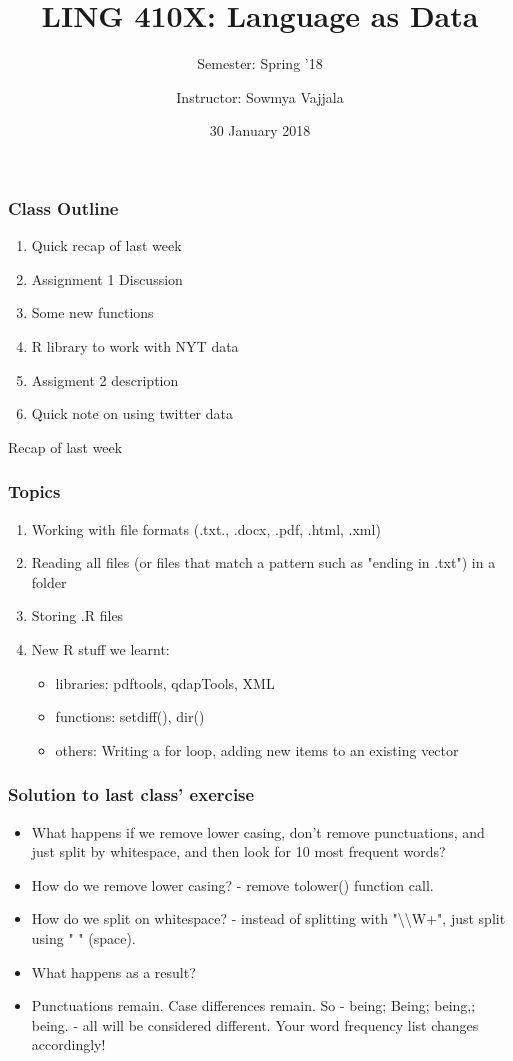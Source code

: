 \documentclass{beamer}
\author[Sowmya Vajjala]{Instructor: Sowmya Vajjala}
\title[LING 410X]{LING 410X: Language as Data}
\subtitle{Semester: Spring '18}
\date{30 January 2018}
\institute{Iowa State University, USA}
\begin{document}
\begin{frame}\titlepage
\end{frame}

\begin{frame}
\frametitle{Class Outline}
\begin{enumerate}
\item Quick recap of last week
\item Assignment 1 Discussion
\item Some new functions 
\item R library to work with NYT data
\item Assigment 2 description
\item Quick note on using twitter data
\end{enumerate}
\end{frame}

\begin{frame}
\Large Recap of last week
\end{frame}

\begin{frame}
\frametitle{Topics}
\begin{enumerate}
\item Working with file formats (.txt., .docx, .pdf, .html, .xml)
\item Reading all files (or files that match a pattern such as "ending in .txt") in a folder
\item Storing .R files
\item New R stuff we learnt:
\begin{itemize}
\item libraries: pdftools, qdapTools, XML
\item functions: setdiff(), dir()
\item others: Writing a for loop, adding new items to an existing vector
\end{itemize}
\end{enumerate}
\end{frame}

\begin{frame}
\frametitle{Solution to last class' exercise}
\begin{itemize}
\item What happens if we remove lower casing, don't remove punctuations, and just split by whitespace, and then look for 10 most frequent words?
\item How do we remove lower casing? - remove tolower() function call.
\item How do we split on whitespace? - instead of splitting with "\textbackslash \textbackslash W+", just split using " " (space). \pause
\item What happens as a result? \pause
\item Punctuations remain. Case differences remain. So - being; Being; being,; being. - all will be considered different. Your word frequency list changes accordingly!
\end{itemize}
\end{frame}
\end{document}
